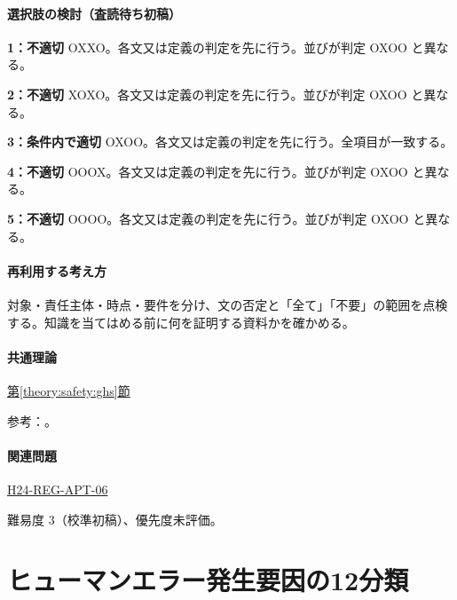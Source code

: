 \paragraph{選択肢の検討（査読待ち初稿）}\mbox{}\par

\noindent\textbf{1：不適切} OXXO。各文又は定義の判定を先に行う。並びが判定 OXOO と異なる。\par

\noindent\textbf{2：不適切} XOXO。各文又は定義の判定を先に行う。並びが判定 OXOO と異なる。\par

\noindent\textbf{3：条件内で適切} OXOO。各文又は定義の判定を先に行う。全項目が一致する。\par

\noindent\textbf{4：不適切} OOOX。各文又は定義の判定を先に行う。並びが判定 OXOO と異なる。\par

\noindent\textbf{5：不適切} OOOO。各文又は定義の判定を先に行う。並びが判定 OXOO と異なる。\par

\paragraph{再利用する考え方} 対象・責任主体・時点・要件を分け、文の否定と「全て」「不要」の範囲を点検する。知識を当てはめる前に何を証明する資料かを確かめる。

\paragraph{共通理論} \hyperref[theory:safety:ghs]{第\ref*{theory:safety:ghs}節}

\par 参考：\cite{saf53_ghs_old,saf53_ghs_notice}。

\paragraph{関連問題} \hyperref[q:h24-reg-apt-06]{H24-REG-APT-06}

\par 難易度 3（校準初稿）、優先度未評価。

\section{ヒューマンエラー発生要因の12分類}

